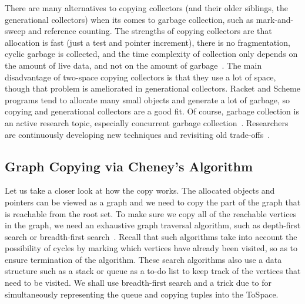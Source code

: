 \documentclass[11pt]{book}
\newcommand{\margincomment}[1]{\marginpar{#1}}
\newcommand{\margincomment}[1]{}
\begin{document}

There are many alternatives to copying collectors (and their older
siblings, the generational collectors) when its comes to garbage
collection, such as mark-and-sweep and reference counting.  The
strengths of copying collectors are that allocation is fast (just a
test and pointer increment), there is no fragmentation, cyclic garbage
is collected, and the time complexity of collection only depends on
the amount of live data, and not on the amount of
garbage~\citep{Wilson:1992fk}. The main disadvantage of two-space
copying collectors is that they use a lot of space, though that
problem is ameliorated in generational collectors.  Racket and Scheme
programs tend to allocate many small objects and generate a lot of
garbage, so copying and generational collectors are a good fit.  Of
course, garbage collection is an active research topic, especially
concurrent garbage collection~\citep{Tene:2011kx}. Researchers are
continuously developing new techniques and revisiting old
trade-offs~\citep{Blackburn:2004aa,Jones:2011aa,Shahriyar:2013aa,Cutler:2015aa,Shidal:2015aa}.

\subsection{Graph Copying via Cheney's Algorithm}
\label{sec:cheney}

Let us take a closer look at how the copy works. The allocated objects
and pointers can be viewed as a graph and we need to copy the part of
the graph that is reachable from the root set. To make sure we copy
all of the reachable vertices in the graph, we need an exhaustive
graph traversal algorithm, such as depth-first search or breadth-first
search~\citep{Moore:1959aa,Cormen:2001uq}. Recall that such algorithms
take into account the possibility of cycles by marking which vertices
have already been visited, so as to ensure termination of the
algorithm. These search algorithms also use a data structure such as a
stack or queue as a to-do list to keep track of the vertices that need
to be visited. We shall use breadth-first search and a trick due to
\citet{Cheney:1970aa} for simultaneously representing the queue and
copying tuples into the ToSpace.
\end{document}

